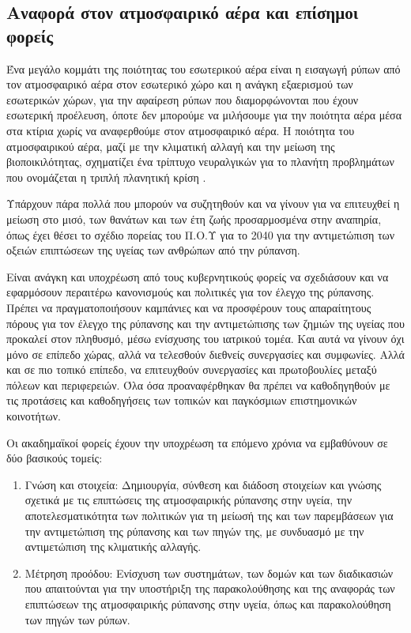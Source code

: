 \FloatBarrier

\subsection{Αναφορά στον ατμοσφαιρικό αέρα και επίσημοι φορείς}

Ένα μεγάλο κομμάτι της ποιότητας του εσωτερικού αέρα είναι η εισαγωγή ρύπων από τον ατμοσφαιρικό αέρα στον εσωτερικό χώρο και η ανάγκη εξαερισμού των εσωτερικών χώρων,
 για την αφαίρεση ρύπων που διαμορφώνονται που έχουν εσωτερική προέλευση,
όποτε δεν μπορούμε να μιλήσουμε για την ποιότητα αέρα μέσα στα κτίρια χωρίς να αναφερθούμε στον ατμοσφαιρικό αέρα. 
Η ποιότητα του ατμοσφαιρικού αέρα, μαζί με την κλιματική αλλαγή και την μείωση της βιοποικιλότητας,
 σχηματίζει ένα τρίπτυχο νευραλγικών για το πλανήτη προβλημάτων που ονομάζεται η τριπλή πλανητική κρίση \cite{WHO12025}.

Υπάρχουν πάρα πολλά που μπορούν να συζητηθούν και να γίνουν για να επιτευχθεί η μείωση στο μισό, των θανάτων και των έτη ζωής προσαρμοσμένα στην αναπηρία, όπως έχει θέσει το σχέδιο πορείας του Π.Ο.Υ 
για το 2040 για την αντιμετώπιση των οξειών επιπτώσεων της υγείας των ανθρώπων από την ρύπανση.

Είναι ανάγκη και υποχρέωση από τους κυβερνητικούς 
φορείς να σχεδιάσουν και να εφαρμόσουν περαιτέρω κανονισμούς και πολιτικές  για τον έλεγχο της ρύπανσης. 
Πρέπει να πραγματοποιήσουν καμπάνιες και να προσφέρουν τους απαραίτητους πόρους για τον έλεγχο της ρύπανσης και την αντιμετώπισης των ζημιών της υγείας που 
προκαλεί στον πληθυσμό, μέσω ενίσχυσης του ιατρικού τομέα. 
Και αυτά να γίνουν όχι μόνο σε επίπεδο χώρας, αλλά να τελεσθούν διεθνείς συνεργασίες και συμφωνίες. 
Αλλά και σε πιο τοπικό επίπεδο, να επιτευχθούν συνεργασίες και πρωτοβουλίες μεταξύ πόλεων και περιφερειών.
Όλα όσα προαναφέρθηκαν θα πρέπει να καθοδηγηθούν με τις προτάσεις και καθοδηγήσεις των τοπικών και παγκόσμιων επιστημονικών κοινοτήτων.\newline

Οι ακαδημαϊκοί φορείς έχουν την υποχρέωση τα επόμενο χρόνια να εμβαθύνουν σε δύο βασικούς τομείς:

\begin{enumerate}[leftmargin=4em]
  \item Γνώση και στοιχεία: Δημιουργία, σύνθεση και διάδοση στοιχείων και γνώσης σχετικά με τις επιπτώσεις της ατμοσφαιρικής ρύπανσης στην υγεία, την αποτελεσματικότητα των πολιτικών για τη μείωσή της και των παρεμβάσεων για την αντιμετώπιση της ρύπανσης και των πηγών της, με συνδυασμό με την αντιμετώπιση της κλιματικής αλλαγής. 
  \item Μέτρηση προόδου: Ενίσχυση των συστημάτων, των δομών και των διαδικασιών που απαιτούνται για την υποστήριξη της παρακολούθησης και της αναφοράς των επιπτώσεων της ατμοσφαιρικής ρύπανσης στην υγεία, όπως και παρακολούθηση των πηγών των ρύπων.
\end{enumerate}



